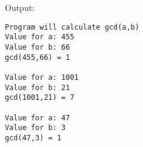 \documentclass[12pt]{article}
\begin{document}
\newpage

Output:

\begin{lstlisting}
Program will calculate gcd(a,b)
Value for a: 455
Value for b: 66
gcd(455,66) = 1

Value for a: 1001
Value for b: 21
gcd(1001,21) = 7

Value for a: 47
Value for b: 3
gcd(47,3) = 1
 



\end{lstlisting}
\end{document}
